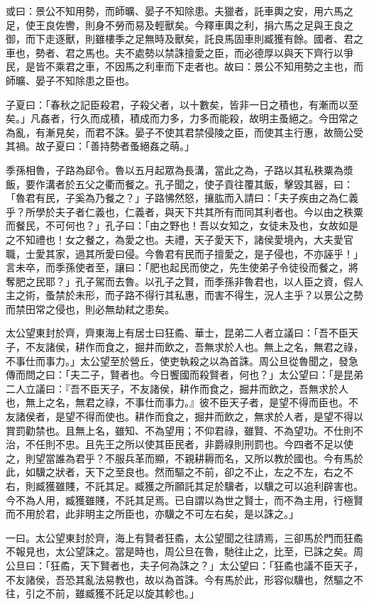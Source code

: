 \begin{pinyinscope}
或曰：景公不知用勢，而師曠、晏子不知除患。夫獵者，託車輿之安，用六馬之足，使王良佐轡，則身不勞而易及輕獸矣。今釋車輿之利，捐六馬之足與王良之御，而下走逐獸，則雖樓季之足無時及獸矣，託良馬固車則臧獲有餘。國者、君之車也，勢者、君之馬也。夫不處勢以禁誅擅愛之臣，而必德厚以與天下齊行以爭民，是皆不乘君之車，不因馬之利車而下走者也。故曰：景公不知用勢之主也，而師曠、晏子不知除患之臣也。

子夏曰：「春秋之記臣殺君，子殺父者，以十數矣，皆非一日之積也，有漸而以至矣。」凡姦者，行久而成積，積成而力多，力多而能殺，故明主蚤絕之。今田常之為亂，有漸見矣，而君不誅。晏子不使其君禁侵陵之臣，而使其主行惠，故簡公受其禍。故子夏曰：「善持勢者蚤絕姦之萌。」

季孫相魯，子路為郈令。魯以五月起眾為長溝，當此之為，子路以其私秩粟為漿飯，要作溝者於五父之衢而餐之。孔子聞之，使子貢往覆其飯，擊毀其器，曰：「魯君有民，子奚為乃餐之？」子路怫然怒，攘肱而入請曰：「夫子疾由之為仁義乎？所學於夫子者仁義也，仁義者，與天下共其所有而同其利者也。今以由之秩粟而餐民，不可何也？」孔子曰：「由之野也！吾以女知之，女徒未及也，女故如是之不知禮也！女之餐之，為愛之也。夫禮，天子愛天下，諸侯愛境內，大夫愛官職，士愛其家，過其所愛曰侵。今魯君有民而子擅愛之，是子侵也，不亦誣乎！」言未卒，而季孫使者至，讓曰：「肥也起民而使之，先生使弟子令徒役而餐之，將奪肥之民耶？」孔子駕而去魯。以孔子之賢，而季孫非魯君也，以人臣之資，假人主之術，蚤禁於未形，而子路不得行其私惠，而害不得生，況人主乎？以景公之勢而禁田常之侵也，則必無劫弒之患矣。

太公望東封於齊，齊東海上有居士曰狂矞、華士，昆弟二人者立議曰：「吾不臣天子，不友諸侯，耕作而食之，掘井而飲之，吾無求於人也。無上之名，無君之祿，不事仕而事力。」太公望至於營丘，使吏執殺之以為首誅。周公旦從魯聞之，發急傳而問之曰：「夫二子，賢者也。今日饗國而殺賢者，何也？」太公望曰：「是昆弟二人立議曰：『吾不臣天子，不友諸侯，耕作而食之，掘井而飲之，吾無求於人也，無上之名，無君之祿，不事仕而事力。』彼不臣天子者，是望不得而臣也。不友諸侯者，是望不得而使也。耕作而食之，掘井而飲之，無求於人者，是望不得以賞罰勸禁也。且無上名，雖知、不為望用；不仰君祿，雖賢、不為望功。不仕則不治，不任則不忠。且先王之所以使其臣民者，非爵祿則刑罰也。今四者不足以使之，則望當誰為君乎？不服兵革而顯，不親耕耨而名，又所以教於國也。今有馬於此，如驥之狀者，天下之至良也。然而驅之不前，卻之不止，左之不左，右之不右，則臧獲雖賤，不託其足。臧獲之所願託其足於驥者，以驥之可以追利辟害也。今不為人用，臧獲雖賤，不託其足焉。已自謂以為世之賢士，而不為主用，行極賢而不用於君，此非明主之所臣也，亦驥之不可左右矣，是以誅之。」

一曰。太公望東封於齊，海上有賢者狂矞，太公望聞之往請焉，三卻馬於門而狂矞不報見也，太公望誅之。當是時也，周公旦在魯，馳往止之，比至，已誅之矣。周公旦曰：「狂矞，天下賢者也，夫子何為誅之？」太公望曰：「狂矞也議不臣天子，不友諸侯，吾恐其亂法易教也，故以為首誅。今有馬於此，形容似驥也，然驅之不往，引之不前，雖臧獲不託足以旋其軫也。」


\end{pinyinscope}
